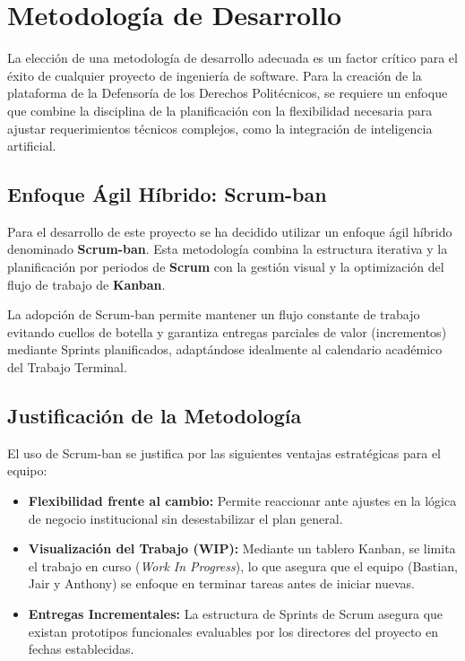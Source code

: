 
\chapter{Metodología de Desarrollo}
\label{cap:metodologia}

\begin{flushleft}
La elección de una metodología de desarrollo adecuada es un factor crítico para el éxito de cualquier proyecto de ingeniería de software. Para la creación de la plataforma de la Defensoría de los Derechos Politécnicos, se requiere un enfoque que combine la disciplina de la planificación con la flexibilidad necesaria para ajustar requerimientos técnicos complejos, como la integración de inteligencia artificial.
\end{flushleft}

\justifying

\section{Enfoque Ágil Híbrido: Scrum-ban}
Para el desarrollo de este proyecto se ha decidido utilizar un enfoque ágil híbrido denominado \textbf{Scrum-ban}. Esta metodología combina la estructura iterativa y la planificación por periodos de \textbf{Scrum} con la gestión visual y la optimización del flujo de trabajo de \textbf{Kanban}. 

La adopción de Scrum-ban permite mantener un flujo constante de trabajo evitando cuellos de botella y garantiza entregas parciales de valor (incrementos) mediante Sprints planificados, adaptándose idealmente al calendario académico del Trabajo Terminal.

\section{Justificación de la Metodología}
El uso de Scrum-ban se justifica por las siguientes ventajas estratégicas para el equipo:
\begin{itemize}
    \item \textbf{Flexibilidad frente al cambio:} Permite reaccionar ante ajustes en la lógica de negocio institucional sin desestabilizar el plan general.
    \item \textbf{Visualización del Trabajo (WIP):} Mediante un tablero Kanban, se limita el trabajo en curso (\textit{Work In Progress}), lo que asegura que el equipo (Bastian, Jair y Anthony) se enfoque en terminar tareas antes de iniciar nuevas.
    \item \textbf{Entregas Incrementales:} La estructura de Sprints de Scrum asegura que existan prototipos funcionales evaluables por los directores del proyecto en fechas establecidas.
\end{itemize}

